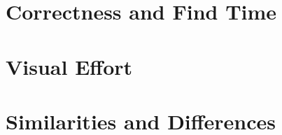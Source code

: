 \iffalse
\begin{itemize}
	\item Don’t make the reader do all the work
	\item Have hypothesis, test them, state result clearly
	\item Two lists are not a comparison
	\item Be the first to criticize your own work
\end{itemize}
\fi

\section{Correctness and Find Time}

\section{Visual Effort}

\section{Similarities and Differences}
